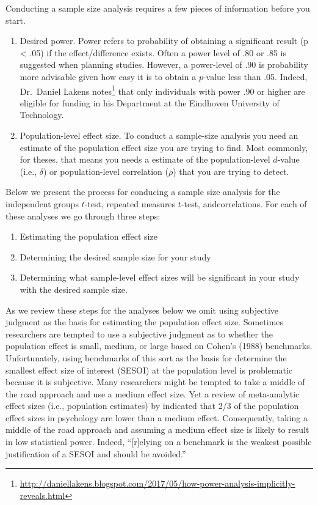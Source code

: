 \documentclass[
]{krantz}
\providecommand{\tightlist}{%
  \setlength{\itemsep}{0pt}\setlength{\parskip}{0pt}}
\renewcommand{\href}[2]{#2\footnote{\url{#1}}}
\begin{document}
Conducting a sample size analysis requires a few pieces of information before you start.

\begin{enumerate}
\def\labelenumi{\arabic{enumi}.}
\item
  Desired power. Power refers to probability of obtaining a significant result (p \textless{} .05) if the effect/difference exists. Often a power level of .80 or .85 is suggested when planning studies. However, a power-level of .90 is probability more advisable given how easy it is to obtain a \(p\)-value less than .05. Indeed, Dr.~Daniel Lakens \href{http://daniellakens.blogspot.com/2017/05/how-power-analysis-implicitly-reveals.html}{notes} that only individuals with power .90 or higher are eligible for funding in his Department at the Eindhoven University of Technology.
\item
  Population-level effect size. To conduct a sample-size analysis you need an estimate of the population effect size you are trying to find. Most commonly, for theses, that means you needs a estimate of the population-level \(d\)-value (i.e., \(\delta\)) or population-level correlation (\(\rho\)) that you are trying to detect.
\end{enumerate}

Below we present the process for conducing a sample size analysis for the independent groups \(t\)-test, repeated measures \(t\)-test, andcorrelations. For each of these analyses we go through three steps:

\begin{enumerate}
\def\labelenumi{\arabic{enumi}.}
\tightlist
\item
  Estimating the population effect size
\item
  Determining the desired sample size for your study
\item
  Determining what sample-level effect sizes will be significant in your study with the desired sample size.
\end{enumerate}

As we review these steps for the analyses below we omit using subjective judgment as the basis for estimating the population effect size. Sometimes researchers are tempted to use a subjective judgment as to whether the population effect is small, medium, or large based on Cohen's (1988) benchmarks. Unfortunately, using benchmarks of this sort as the basis for determine the smallest effect size of interest (SESOI) at the population level is problematic because it is subjective. Many researchers might be tempted to take a middle of the road approach and use a medium effect size. Yet a review of meta-analytic effect sizes (i.e., population estimates) by \citep{hemphill2003interpreting} indicated that 2/3 of the population effect sizes in psychology are lower than a medium effect. Consequently, taking a middle of the road approach and assuming a medium effect size is likely to result in low statistical power. Indeed, ``{[}r{]}elying on a benchmark is the weakest possible justification of a SESOI and should be avoided.'' \citep[p.~262,][]{lakens2018equivalence}
\end{document}
